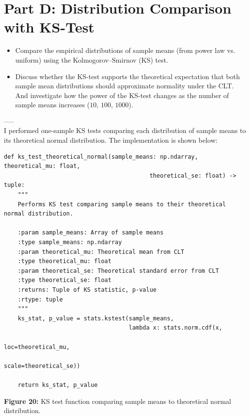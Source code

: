 \section{Part D: Distribution Comparison with KS-Test}
\begin{itemize}
    \item Compare the empirical distributions of sample means (from power law vs. uniform) using the Kolmogorov--Smirnov (KS) test.
    \item Discuss whether the KS-test supports the theoretical expectation that both sample mean distributions should approximate normality under the CLT. And investigate how the power of the KS-test changes as the number of sample means increases ($10$, $100$, $1000$).
\end{itemize}
-----\\

I performed one-sample KS tests comparing each distribution of sample means to its theoretical normal distribution. The implementation is shown below:

\begin{verbatim}
def ks_test_theoretical_normal(sample_means: np.ndarray, theoretical_mu: float,
                                          theoretical_se: float) -> tuple:
    """
    Performs KS test comparing sample means to their theoretical normal distribution.
    
    :param sample_means: Array of sample means
    :type sample_means: np.ndarray
    :param theoretical_mu: Theoretical mean from CLT
    :type theoretical_mu: float
    :param theoretical_se: Theoretical standard error from CLT
    :type theoretical_se: float
    :returns: Tuple of KS statistic, p-value
    :rtype: tuple
    """
    ks_stat, p_value = stats.kstest(sample_means, 
                                    lambda x: stats.norm.cdf(x, 
                                                             loc=theoretical_mu, 
                                                             scale=theoretical_se))
    
    return ks_stat, p_value
\end{verbatim}
\begin{center}
\textbf{Figure 20:} KS test function comparing sample means to theoretical normal distribution.\\
\end{center}

